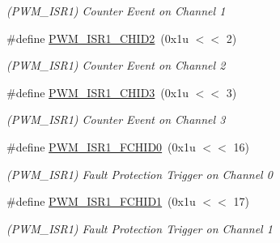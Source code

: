 \begin{DoxyCompactItemize}
\begin{DoxyCompactList}\small\item\em (P\+W\+M\+\_\+\+I\+S\+R1) Counter Event on Channel 1 \end{DoxyCompactList}\item 
\mbox{\label{group__SAME70__PWM_ga877d53e5a7f56b6fa1a120a152504a75}} 
\#define \mbox{\hyperlink{group__SAME70__PWM_ga877d53e5a7f56b6fa1a120a152504a75}{P\+W\+M\+\_\+\+I\+S\+R1\+\_\+\+C\+H\+I\+D2}}~(0x1u $<$$<$ 2)
\begin{DoxyCompactList}\small\item\em (P\+W\+M\+\_\+\+I\+S\+R1) Counter Event on Channel 2 \end{DoxyCompactList}\item 
\mbox{\label{group__SAME70__PWM_gaa9bfd7b941b6dd602ec557c93b048b7c}} 
\#define \mbox{\hyperlink{group__SAME70__PWM_gaa9bfd7b941b6dd602ec557c93b048b7c}{P\+W\+M\+\_\+\+I\+S\+R1\+\_\+\+C\+H\+I\+D3}}~(0x1u $<$$<$ 3)
\begin{DoxyCompactList}\small\item\em (P\+W\+M\+\_\+\+I\+S\+R1) Counter Event on Channel 3 \end{DoxyCompactList}\item 
\mbox{\label{group__SAME70__PWM_ga57d6aa67fe3a37f1fa0ab36d04be164f}} 
\#define \mbox{\hyperlink{group__SAME70__PWM_ga57d6aa67fe3a37f1fa0ab36d04be164f}{P\+W\+M\+\_\+\+I\+S\+R1\+\_\+\+F\+C\+H\+I\+D0}}~(0x1u $<$$<$ 16)
\begin{DoxyCompactList}\small\item\em (P\+W\+M\+\_\+\+I\+S\+R1) Fault Protection Trigger on Channel 0 \end{DoxyCompactList}\item 
\mbox{\label{group__SAME70__PWM_ga440b312b3cdf88e66ac626741fbc5427}} 
\#define \mbox{\hyperlink{group__SAME70__PWM_ga440b312b3cdf88e66ac626741fbc5427}{P\+W\+M\+\_\+\+I\+S\+R1\+\_\+\+F\+C\+H\+I\+D1}}~(0x1u $<$$<$ 17)
\begin{DoxyCompactList}\small\item\em (P\+W\+M\+\_\+\+I\+S\+R1) Fault Protection Trigger on Channel 1 \end{DoxyCompactList}\item 
\mbox{\label{group__SAME70__PWM_gaff4258f3fafae81aa9d871e8bf9d656e}} 

\end{DoxyCompactItemize}
